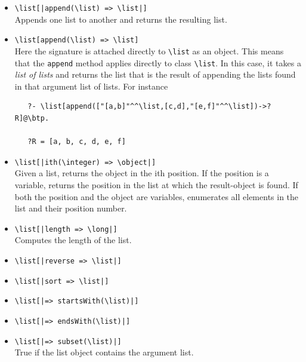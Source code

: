 \documentclass[11pt]{article}
\newcommand{\bs}{\textbackslash}
\begin{document}
\begin{itemize}
\begin{verbatim}
    ?X = ?_h4800
    ?R = [a, b(1), c, b(1)]
\end{verbatim}
  Note that \texttt{b(?X)} was deleted, but not \texttt{b(1)}. On the other hand,
\begin{verbatim}
   ?- "[a,b(1),c,b(1)]"^^\list[delete(b(1))->?R]@\btp. 

   ?R = [a, c]
\end{verbatim}
  i.e., all occurrences of \texttt{b(1)} are deleted.
\item {\tt \bs{}list[|append(\bs{}list) => \bs{}list|]}  \\
  Appends one list to another and returns the resulting list.
\item \texttt{\bs{}list[append(\bs{}list) => \bs{}list]} \\
  Here the signature is attached directly to \texttt{\bs{}list} as an
  object. This means that the \texttt{append} method applies directly to
  class \texttt{\bs{}list}. In this case, it takes a \emph{list of lists}
  and returns the list that is the result of appending the lists found in
  that argument list of lists. For instance
\begin{verbatim}
   ?- \list[append(["[a,b]"^^\list,[c,d],"[e,f]"^^\list])->?R]@\btp.  

   ?R = [a, b, c, d, e, f]
\end{verbatim}
\item {\tt \bs{}list[|ith(\bs{}integer) => \bs{}object|]}  \\
  Given a list, returns the object in the ith position. If the position is
  a variable, returns the position in the list at which the result-object
  is found. If both the position and the object are variables, enumerates
  all elements in the list and their position number.
\item {\tt \bs{}list[|length => \bs{}long|]}  
  \\
  Computes the length of the list.
\item {\tt \bs{}list[|reverse => \bs{}list|]}  
\item {\tt \bs{}list[|sort => \bs{}list|]}  
\item {\tt \bs{}list[|=> startsWith(\bs{}list)|]}  
\item {\tt \bs{}list[|=> endsWith(\bs{}list)|]}  
\item {\tt \bs{}list[|=> subset(\bs{}list)|]}  
  \\
  True if the list object contains the argument list.
\end{itemize}
\end{document}
